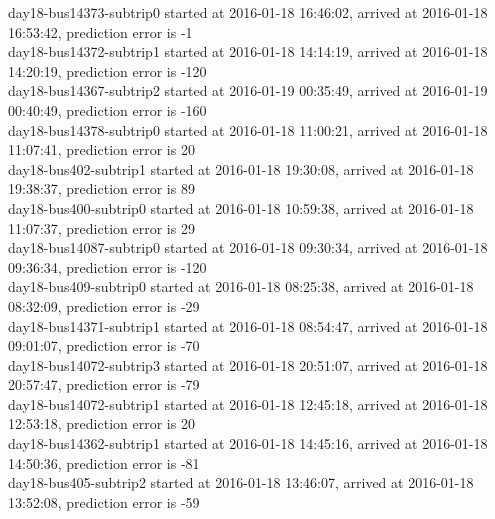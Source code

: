 \documentclass[12pt,a4paper,oneside,openright]{report}
\begin{document}
{day18-bus14373-subtrip0 started at 2016-01-18 16:46:02, arrived at 2016-01-18 16:53:42, prediction error is -1 \\
day18-bus14372-subtrip1 started at 2016-01-18 14:14:19, arrived at 2016-01-18 14:20:19, prediction error is -120 \\
day18-bus14367-subtrip2 started at 2016-01-19 00:35:49, arrived at 2016-01-19 00:40:49, prediction error is -160 \\
day18-bus14378-subtrip0 started at 2016-01-18 11:00:21, arrived at 2016-01-18 11:07:41, prediction error is 20 \\
day18-bus402-subtrip1 started at 2016-01-18 19:30:08,    arrived at 2016-01-18 19:38:37, prediction error is 89 \\
day18-bus400-subtrip0 started at 2016-01-18 10:59:38,    arrived at 2016-01-18 11:07:37, prediction error is 29 \\
day18-bus14087-subtrip0 started at 2016-01-18 09:30:34, arrived at 2016-01-18 09:36:34, prediction error is -120 \\
day18-bus409-subtrip0 started at 2016-01-18 08:25:38,    arrived at 2016-01-18 08:32:09, prediction error is -29 \\
day18-bus14371-subtrip1 started at 2016-01-18 08:54:47, arrived at 2016-01-18 09:01:07, prediction error is -70 \\
day18-bus14072-subtrip3 started at 2016-01-18 20:51:07, arrived at 2016-01-18 20:57:47, prediction error is -79 \\
day18-bus14072-subtrip1 started at 2016-01-18 12:45:18, arrived at 2016-01-18 12:53:18, prediction error is 20 \\
day18-bus14362-subtrip1 started at 2016-01-18 14:45:16, arrived at 2016-01-18 14:50:36, prediction error is -81 \\
day18-bus405-subtrip2 started at 2016-01-18 13:46:07,    arrived at 2016-01-18 13:52:08, prediction error is -59 \\
}

\newpage
\end{document}
